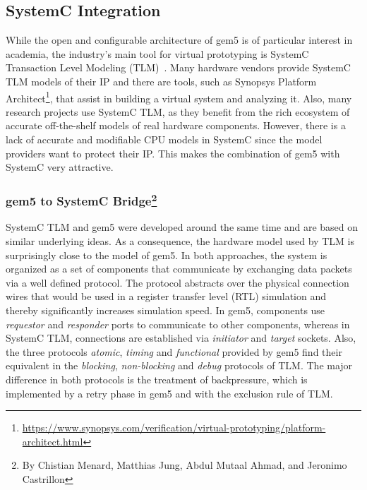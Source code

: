 \subsection[SystemC Integration]{SystemC Integration}

While the open and configurable architecture of gem5 is of particular interest
in academia, the industry's main tool for virtual prototyping is SystemC
Transaction Level Modeling (TLM)~\cite{systemc_ieee11}. Many hardware vendors
provide SystemC TLM models of their IP and there are tools, such as Synopsys
Platform Architect\footnote{\url{https://www.synopsys.com/verification/virtual-prototyping/platform-architect.html}},
that assist in building a virtual system and analyzing it. Also, many research
projects use SystemC TLM, as they benefit from the rich ecosystem of accurate
off-the-shelf models of real hardware components. However, there is a lack of
accurate and modifiable CPU models in SystemC since the model providers want to
protect their IP. This makes the combination of gem5 with SystemC very
attractive.

\subsubsection[gem5 to SystemC Bridge]{gem5 to SystemC Bridge\footnote{By Chistian Menard, Matthias Jung, Abdul Mutaal Ahmad, and Jeronimo Castrillon}}

SystemC TLM and gem5 were developed around the same time and are based on
similar underlying ideas. As a consequence, the hardware model used by TLM is
surprisingly close to the model of gem5. In both approaches, the system is
organized as a set of components that communicate by exchanging data packets
via a well defined protocol. The protocol abstracts over the physical
connection wires that would be used in a register transfer level (RTL)
simulation and thereby significantly increases simulation speed. In gem5,
components use \emph{requestor} and \emph{responder} ports to communicate to other
components, whereas in SystemC TLM, connections are established via
\emph{initiator} and \emph{target} sockets. Also, the three protocols
\emph{atomic}, \emph{timing} and \emph{functional} provided by gem5 find their
equivalent in the \emph{blocking}, \emph{non-blocking} and \emph{debug}
protocols of TLM. The major difference in both protocols is the treatment of
backpressure, which is implemented by a retry phase in gem5 and with the
exclusion rule of TLM.

